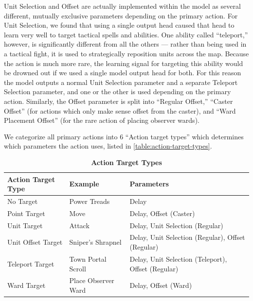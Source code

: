 \documentclass[ocean-paper.tex]{subfiles}
\begin{document}

Unit Selection and Offset are actually implemented within the model as several different, mutually exclusive parameters depending on the primary action. For Unit Selection, we found that using a single output head caused that head to learn very well to target tactical spells and abilities. One ability called ``teleport,'' however, is significantly different from all the others --- rather than being used in a tactical fight, it is used to strategically reposition units across the map. Because the action is much more rare, the learning signal for targeting this ability would be drowned out if we used a single model output head for both. For this reason the model outputs a normal Unit Selection parameter and a separate Teleport Selection parameter, and one or the other is used depending on the primary action. Similarly, the Offset parameter is split into ``Regular Offset,'' ``Caster Offset'' (for actions which only make sense offset from the caster), and ``Ward Placement Offset'' (for the rare action of placing observer wards).

We categorize all primary actions into 6 ``Action target types'' which determines which parameters the action uses, listed in \autoref{table:action-target-types}.

\begin{table}
\begin{tabular}{lll}
Action Target Type & Example & Parameters \\\hline
No Target & Power Treads & Delay
\\
Point Target & Move & Delay, Offset (Caster)
\\
Unit Target & Attack & Delay, Unit Selection (Regular)
\\
Unit Offset Target & Sniper's Shrapnel & Delay, Unit Selection (Regular), Offset (Regular)
\\
Teleport Target & Town Portal Scroll & Delay, Unit Selection (Teleport), Offset (Regular)
\\
Ward Target & Place Observer Ward & Delay, Offset (Ward)
\\
\end{tabular}
\caption{\textbf{Action Target Types}}
\label{table:action-target-types}
\end{table}
\end{document}
